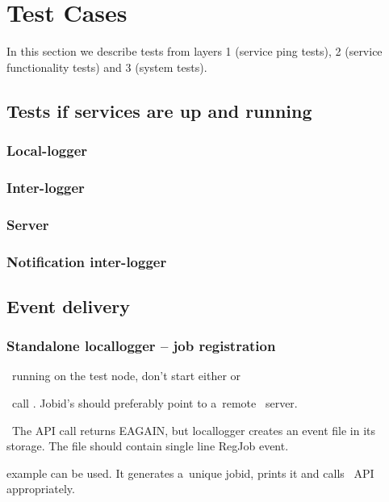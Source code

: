 \section{Test Cases}

In this section we describe tests from layers 1 (service ping tests), 
2 (service functionality tests) and 3 (system tests). 



\subsection{Tests if services are up and running}

\subsubsection{Local-logger}
\subsubsection{Inter-logger}
\subsubsection{Server}
\subsubsection{Notification inter-logger}


\subsection{Event delivery}

\subsubsection{Standalone locallogger -- job registration}
\label{reg}
\req\ running  on the test node, don't start either
 or 

\how\ call . Jobid's should preferably point
to a~remote \LB\ server.

\result\ The API call returns EAGAIN, but locallogger creates an event file
in its storage.
The file should contain single line RegJob event.

\begin{hints}
 example can be used. It generates a~unique jobid,
prints it and calls \LB\ API appropriately.
\end{hints}

